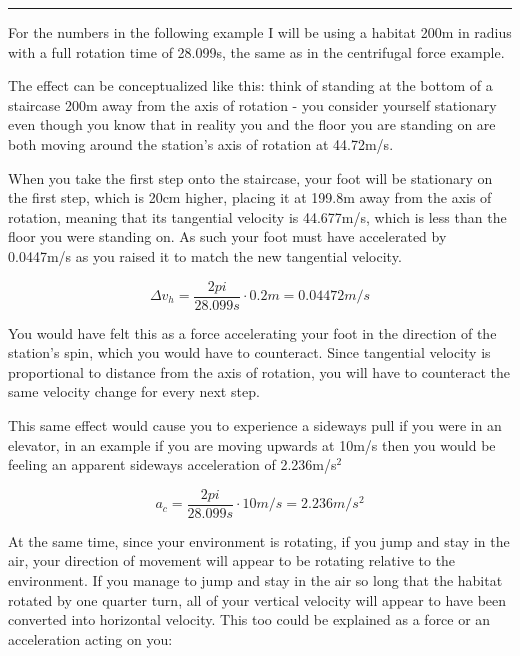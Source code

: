 \documentclass[a4paper]{article}
\begin{document}
	\medskip
	
	\noindent\rule{\linewidth}{1pt}
	
	\medskip
	
	For the numbers in the following example I will be using a habitat 200m in radius with a full rotation time of 28.099s, the same as in the centrifugal force example.
	
	\medskip
	
	The effect can be conceptualized like this: think of standing at the bottom of a staircase 200m away from the axis of rotation - you consider yourself stationary even though you know that in reality you and the floor you are standing on are both moving around the station's axis of rotation at 44.72m/s.
	
	\medskip
	
	When you take the first step onto the staircase, your foot will be stationary on the first step, which is 20cm higher, placing it at 199.8m away from the axis of rotation, meaning that its tangential velocity is 44.677m/s, which is less than the floor you were standing on. As such your foot must have accelerated by 0.0447m/s as you raised it to match the new tangential velocity.
	
	$$ \Delta v_h = \frac{2pi}{28.099s} \cdot 0.2m = 0.04472m/s $$
	
	You would have felt this as a force accelerating your foot in the direction of the station's spin, which you would have to counteract. Since tangential velocity is proportional to distance from the axis of rotation, you will have to counteract the same velocity change for every next step.
	
	\medskip
	
	This same effect would cause you to experience a sideways pull if you were in an elevator, in an example if you are moving upwards at 10m/s then you would be feeling an apparent sideways acceleration of 2.236m/s$^2$
	
	$$ a_c = \frac{2pi}{28.099s} \cdot 10m/s = 2.236m/s^2 $$
	
	\pagebreak
	
	\iffalse
	
	At the same time, since your environment is rotating, if you jump and stay in the air, your direction of movement will appear to be rotating relative to the environment.
	If you manage to jump and stay in the air so long that the habitat rotated by one quarter turn, all of your vertical velocity will appear to have been converted into horizontal velocity.
	This too could be explained as a force or an acceleration acting on you:
	
\end{document}
